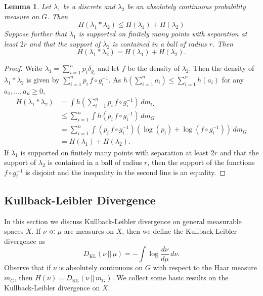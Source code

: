\documentclass[10pt, english,oneside,reqno]{amsart}
\theoremstyle{plain}
\newtheorem{lemma}[theorem]{Lemma}
\theoremstyle{remark}
\numberwithin{equation}{section}
\numberwithin{figure}{section}
\newcommand{\Haarof}[1]{m_{#1}}
\begin{document}
\begin{lemma}\label{EntProd}
    Let $\lambda_1$ be a discrete and $\lambda_2$ be an absolutely continuous probability measure on $G$. Then $$H(\lambda_1 * \lambda_2) \leq H(\lambda_1) + H(\lambda_2)$$ Suppose further that $\lambda_1$ is supported on finitely many points with separation at least $2r$ and that the support of $\lambda_2$ is contained in a ball of radius $r$. Then
    $$H(\lambda_1 * \lambda_2) = H(\lambda_1) + H(\lambda_2).$$
\end{lemma}

\begin{proof}
    Write $\lambda_1 = \sum_{i = 1}^n p_i \delta_{g_i}$ and let $f$ be the density of $\lambda_2$. Then the density of $\lambda_1 * \lambda_2$ is given by $\sum_{i = 1}^n p_i \, f \circ g_i^{-1}$. As $h(\sum_{i = 1}^n a_i) \leq \sum_{i = 1}^n h(a_i)$ for any $a_1, \ldots , a_n \geq 0$, 
    \begin{align*}
        H(\lambda_1 * \lambda_2) &= \int h\left(\sum_{i = 1}^n p_i \, f \circ g_i^{-1}\right) \, d\Haarof{G} \\ &\leq \sum_{i = 1}^n \int h(p_i \, f \circ g_i^{-1}) \, d\Haarof{G} \\
        &= \sum_{i = 1}^n \int (p_i \, f \circ g_i^{-1}) (\log(p_i) + \log( f \circ g_i^{-1})) \, d\Haarof{G} \\
        &= H(\lambda_1) + H(\lambda_2).
    \end{align*} If $\lambda_1$ is supported on finitely many points with separation at least $2r$ and that the support of $\lambda_2$ is contained in a ball of radius $r$, then the support of the functions $f \circ g_i^{-1}$ is disjoint and the inequality in the second line is an equality.
\end{proof}

\subsection{Kullback-Leibler Divergence} \label{Entropy:KL} In this section we discuss Kullback-Leibler divergence on general measurable spaces $X$. If $\nu \ll \mu$ are measures on $X$, then we define the Kullback-Leibler divergence as $$D_{\mathrm{KL}}(\nu \, || \, \mu) = -\int \log \frac{d\nu}{d\mu} \, d\nu.$$ Observe that if $\nu$ is absolutely continuous on $G$ with respect to the Haar measure $\Haarof{G}$, then $H(\nu) = D_{\mathrm{KL}}(\nu \, || \, \Haarof{G})$. We collect some basic results on the Kullback-Leibler divergence on $X$.
\end{document}
